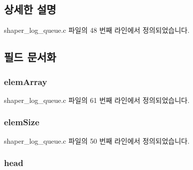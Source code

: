 \subsection{상세한 설명}


shaper\+\_\+log\+\_\+queue.\+c 파일의 48 번째 라인에서 정의되었습니다.



\subsection{필드 문서화}
\subsubsection[{\texorpdfstring{elem\+Array}{elemArray}}]{ elem\+Array}\hypertarget{structshaper__log__queue_afe814895f352c04859b102386d68a966}{}\label{structshaper__log__queue_afe814895f352c04859b102386d68a966}


shaper\+\_\+log\+\_\+queue.\+c 파일의 61 번째 라인에서 정의되었습니다.

\subsubsection[{\texorpdfstring{elem\+Size}{elemSize}}]{ elem\+Size}\hypertarget{structshaper__log__queue_adcb87f2809f48c3f44fc756c261ecde1}{}\label{structshaper__log__queue_adcb87f2809f48c3f44fc756c261ecde1}


shaper\+\_\+log\+\_\+queue.\+c 파일의 50 번째 라인에서 정의되었습니다.

\subsubsection[{\texorpdfstring{head}{head}}]{ head}\hypertarget{structshaper__log__queue_ac8143ecb1dda85e708e5252e0106dd13}{}\label{structshaper__log__queue_ac8143ecb1dda85e708e5252e0106dd13}


